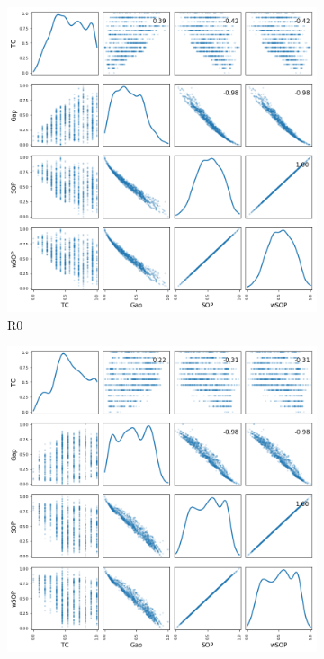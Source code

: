 \begin{figure}[!htbp]	
	\begin{adjustwidth}{-1cm}{-1cm}
		\centering
		\begin{subfigure}{0.35\textwidth}
			\includegraphics[width=\columnwidth]{Figure/NumGaps_SOP_TC_wSOP/precomputedInit/R0/fig/scatter_mattrix}
			\caption{R0}
		\end{subfigure}	
		\begin{subfigure}{0.35\textwidth}
			\includegraphics[width=\columnwidth]{Figure/NumGaps_SOP_TC_wSOP/precomputedInit/R4/fig/scatter_mattrix}

\end{subfigure}
\end{adjustwidth}
\end{figure}
